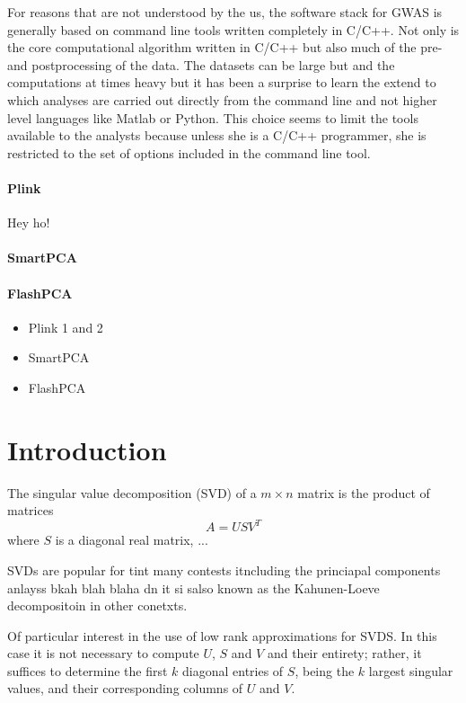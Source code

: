 \documentclass[final,leqno]{siamltex1213}
\begin{document}
For reasons that are not understood by the us, the software stack for GWAS is generally based on command line tools written completely in C/C++. Not only is the core computational algorithm written in C/C++ but also much of the pre- and postprocessing of the data. The datasets can be large but and the computations at times heavy but it has been a surprise to learn the extend to which analyses are carried out directly from the command line and not higher level languages like Matlab or Python. This choice seems to limit the tools available to the analysts because unless she is a C/C++ programmer, she is restricted to the set of options included in the command line tool.

\paragraph{Plink}
Hey ho!

\paragraph{SmartPCA}

\paragraph{FlashPCA}

\begin{itemize}
    \item Plink 1 and 2
    \item SmartPCA
    \item FlashPCA
\end{itemize}


\section{Introduction}

The singular value decomposition (SVD) of a $m\times n$ matrix is
the product of matrices
\[
A=USV^{T}
\]
where $S$ is a diagonal real matrix, ...

SVDs are popular for tint many contests itncluding the princiapal
components anlayss bkah blah blaha dn it si salso known as the Kahunen-Loeve
decompositoin in other conetxts.

Of particular interest in the use of low rank approximations for SVDS.
In this case it is not necessary to compute $U$, $S$ and $V$ and
their entirety; rather, it suffices to determine the first $k$ diagonal
entries of $S$, being the $k$ largest singular values, and their
corresponding columns of $U$ and $V$.
\end{document}
